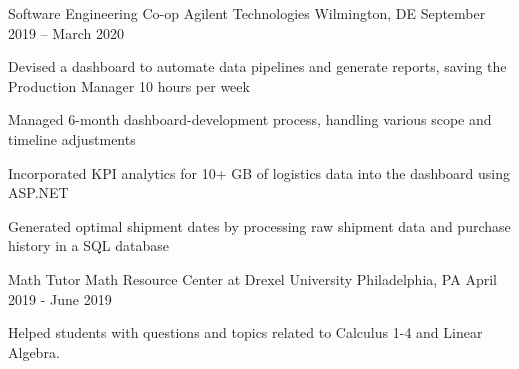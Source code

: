 \begin{cventries}
	\cventry
	{Software Engineering Co-op}
	{Agilent Technologies}
	{Wilmington, DE}
	{September 2019 – March 2020}
	{\begin{cvitems}
	    \item {Devised a dashboard to automate data pipelines and generate reports, saving the Production Manager 10 hours per week}
        \item {Managed 6-month dashboard-development process, handling various scope and timeline adjustments}
		\item {Incorporated KPI analytics for 10+ GB of logistics data into the dashboard using ASP.NET}
        \item {Generated optimal shipment dates by processing raw shipment data and purchase history in a SQL database}
		\end{cvitems}}
	
	
	\cventry
	{Math Tutor}
	{Math Resource Center at Drexel University}
	{Philadelphia, PA}
	{April 2019 - June 2019}
	{\begin{cvitems}
		\item {Helped students with questions and topics related to Calculus 1-4 and Linear Algebra.}
	\end{cvitems}}


\end{cventries}
